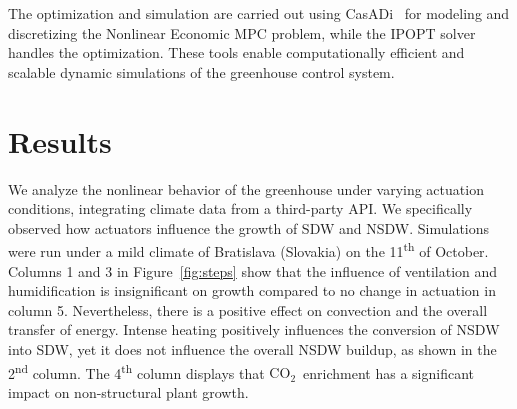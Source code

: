 \documentclass[conference]{IEEEtran}
\newcommand{\coo}{\ensuremath{\mathrm{CO_2}}}
\begin{document}
The optimization and simulation are carried out using CasADi~\cite{Andersson2019} for modeling and discretizing the Nonlinear Economic MPC problem, while the IPOPT solver~\cite{Wachter2006} handles the optimization. These tools enable computationally efficient and scalable dynamic simulations of the greenhouse control system.

\section{Results}
We analyze the nonlinear behavior of the greenhouse under varying actuation conditions, integrating climate data from a third-party API. We specifically observed how actuators influence the growth of SDW and NSDW. Simulations were run under a mild climate of Bratislava (Slovakia) on the 11\textsuperscript{th} of October. Columns 1 and 3 in Figure~\ref{fig:steps} show that the influence of ventilation and humidification is insignificant on growth compared to no change in actuation in column 5. Nevertheless, there is a positive effect on convection and the overall transfer of energy. Intense heating positively influences the conversion of NSDW into SDW, yet it does not influence the overall NSDW buildup, as shown in the 2\textsuperscript{nd} column. The 4\textsuperscript{th} column displays that \coo\ enrichment has a significant impact on non-structural plant growth.
\end{document}
